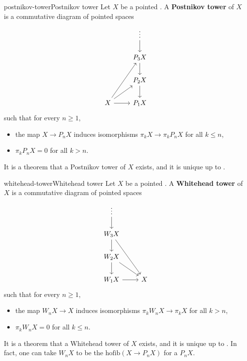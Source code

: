 \begin{topic}{postnikov-tower}{Postnikov tower}
    Let $X$ be a  pointed . A \textbf{Postnikov tower} of $X$ is a commutative diagram of pointed spaces
    \[ \begin{tikzcd}
        & \vdots \arrow{d} \\ & P_3 X \arrow{d} \\ & P_2 X \arrow{d} \\ X \arrow{r} \arrow{ru} \arrow{ruu} & P_1 X
    \end{tikzcd} \]
    such that for every $n \ge 1$,
    \begin{itemize}
        \item the map $X \to P_n X$ induces isomorphisms $\pi_k X \to \pi_k P_n X$ for all $k \le n$,
        \item $\pi_k P_n X = 0$ for all $k > n$.
    \end{itemize}
    It is a theorem that a Postnikov tower of $X$ exists, and it is unique up to .
\end{topic}

\begin{topic}{whitehead-tower}{Whitehead tower}
    Let $X$ be a  pointed . A \textbf{Whitehead tower} of $X$ is a commutative diagram of pointed spaces
    \[ \begin{tikzcd}
        \vdots \arrow{d} & \\ W_3 X \arrow{d} \arrow{ddr} & \\ W_2 X \arrow{d} \arrow{dr} & \\ W_1 X \arrow{r} & X
    \end{tikzcd} \]
    such that for every $n \ge 1$,
    \begin{itemize}
        \item the map $W_n X \to X$ induces isomorphisms $\pi_k W_n X \to \pi_k X$ for all $k > n$,
        \item $\pi_k W_n X = 0$ for all $k \le n$.
    \end{itemize}
    It is a theorem that a Whitehead tower of $X$ exists, and it is unique up to . In fact, one can take $W_n X$ to be the  $\text{hofib}(X \to P_n X)$ for a  $P_n X$.
\end{topic}

